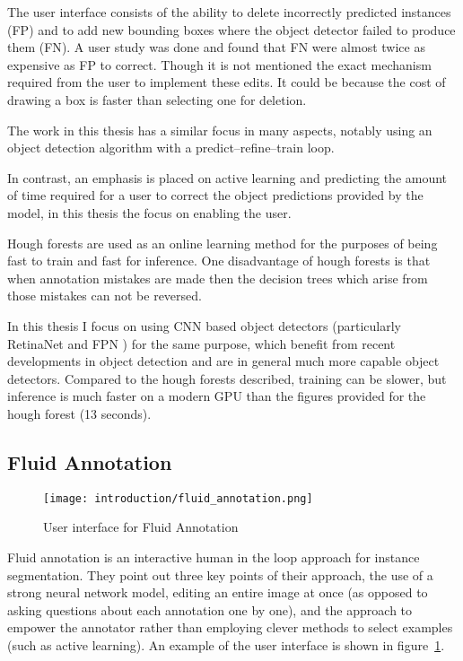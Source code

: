 The user interface consists of the ability to delete incorrectly predicted instances (\gls{FP}) and to add new bounding boxes where the object detector failed to produce them (\gls{FN}). A user study was done and found that \gls{FN} were almost twice as expensive as \gls{FP} to correct. Though it is not mentioned the exact mechanism required from the user to implement these edits. It could be because the cost of drawing a box is faster than selecting one for deletion.


The work in this thesis has a similar focus in many aspects, notably using an object detection algorithm with a predict--refine--train loop. 

In contrast, an emphasis is placed on active learning and predicting the amount of time required for a user to correct the object predictions provided by the model, in this thesis the focus on enabling the user. 

Hough forests \cite{Gall2011} are used as an online learning method for the purposes of being fast to train and fast for inference. One disadvantage of hough forests is that when annotation mistakes are made then the decision trees which arise from those mistakes can not be reversed. 

In this thesis I focus on using \gls{CNN} based object detectors (particularly RetinaNet \cite{Lin2017} and \gls{FPN} \cite{Lin2017a}) for the same purpose, which benefit from recent developments in object detection and are in general much more capable object detectors. Compared to the hough forests described, training can be slower, but inference is much faster on a modern \gls{GPU} than the figures provided for the hough forest (13 seconds).



\subsection{Fluid Annotation \cite{Andriluka2018}}
\begin{figure}[h]
  \centering
  \texttt{[image: introduction/fluid\_annotation.png]}
  \caption{User interface for Fluid Annotation \cite{Andriluka2018}}  
  \label{fig:fluid_annotation}
\end{figure}

Fluid annotation is an interactive human in the loop approach for instance segmentation. They point out three key points of their approach, the use of a strong neural network model, editing an entire image at once (as opposed to asking questions about each annotation one by one), and the approach to empower the annotator rather than employing clever methods to select examples (such as active learning). An example of the user interface is shown in figure~\ref{fig:fluid_annotation}.

